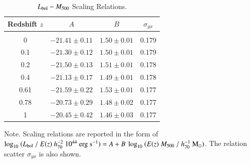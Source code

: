 \documentclass[traditabstract]{aa}
\newcommand{\rmn}{\mathrm}
\begin{document}
\begin{table}[t]
\begin{center}
\caption{$L_{\rm{bol}}-M_{500}$ Scaling Relations.}
\medskip
\begin{tabular}{cccc}
\hline
\phantom{\Big|}
Redshift $z$ & $A$ & $B$ & $\sigma_{yx}$ \\
\hline \\[-0.5em]
 0      & $-21.41\pm0.11$ & $1.50\pm0.01$ & 0.179\\
 0.1   & $-21.30\pm0.12$ & $1.50\pm0.01$ & 0.179\\
 0.2   & $-21.50\pm0.13$ & $1.51\pm0.01$ & 0.178\\ 
 0.4   & $-21.13\pm0.17$ & $1.49\pm0.01$ & 0.178\\ 
 0.61 & $-21.59\pm0.22$ & $1.53\pm0.01$ & 0.177\\ 
 0.78 & $-20.73\pm0.29$ & $1.48\pm0.02$ & 0.177\\ 
 1      & $-20.45\pm0.42$ & $1.46\pm0.03$ & 0.177\\[0.5em]
\hline
\end{tabular}
\label{tab:LMfits}
\end{center}
\footnotesize{Note. Scaling relations are reported in the form of $\log_{10}~(L_{\rm{bol}}~/~E(z)~h_{70}^{-2}~10^{44}~\rmn{erg~s}^{-1})=A+B~\log_{10}~(E(z)~M_{500}~/~h_{70}^{-1}~\rmn{M_{\odot}})$. The relation scatter $\sigma_{yx}$ is also shown.}
\end{table}
\end{document}
